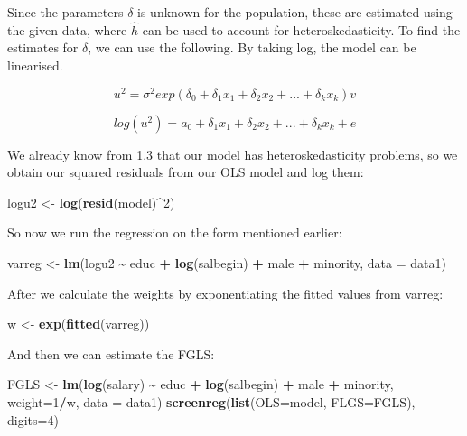 \documentclass[
]{article}
\newenvironment{Shaded}{\begin{snugshade}}{\end{snugshade}}
\newcommand{\AttributeTok}[1]{\textcolor[rgb]{0.13,0.29,0.53}{#1}}
\newcommand{\DecValTok}[1]{\textcolor[rgb]{0.00,0.00,0.81}{#1}}
\newcommand{\FunctionTok}[1]{\textcolor[rgb]{0.13,0.29,0.53}{\textbf{#1}}}
\newcommand{\NormalTok}[1]{#1}
\newcommand{\OtherTok}[1]{\textcolor[rgb]{0.56,0.35,0.01}{#1}}
\newcommand{\SpecialCharTok}[1]{\textcolor[rgb]{0.81,0.36,0.00}{\textbf{#1}}}
\begin{document}
Since the parameters \(\delta\) is unknown for the population, these are
estimated using the given data, where \(\hat{h}\) can be used to account
for heteroskedasticity. To find the estimates for \(\delta\), we can use
the following. By taking log, the model can be linearised.

\[u^2=\sigma^2exp(\delta_0+\delta_1x_1+\delta_2x_2+...+\delta_kx_k)v\]

\[log(u^2)=a_0+\delta_1x_1+\delta_2x_2+...+\delta_kx_k+e\]

We already know from 1.3 that our model has heteroskedasticity problems,
so we obtain our squared residuals from our OLS model and log them:

\begin{Shaded}
\begin{Highlighting}[]
\NormalTok{logu2 }\OtherTok{\textless{}{-}} \FunctionTok{log}\NormalTok{(}\FunctionTok{resid}\NormalTok{(model)}\SpecialCharTok{\^{}}\DecValTok{2}\NormalTok{)}
\end{Highlighting}
\end{Shaded}

So now we run the regression on the form mentioned earlier:

\begin{Shaded}
\begin{Highlighting}[]
\NormalTok{varreg }\OtherTok{\textless{}{-}} \FunctionTok{lm}\NormalTok{(logu2 }\SpecialCharTok{\textasciitilde{}}\NormalTok{ educ }\SpecialCharTok{+} \FunctionTok{log}\NormalTok{(salbegin) }\SpecialCharTok{+}\NormalTok{ male }\SpecialCharTok{+}\NormalTok{ minority, }\AttributeTok{data =}\NormalTok{ data1)}
\end{Highlighting}
\end{Shaded}

After we calculate the weights by exponentiating the fitted values from
varreg:

\begin{Shaded}
\begin{Highlighting}[]
\NormalTok{w }\OtherTok{\textless{}{-}} \FunctionTok{exp}\NormalTok{(}\FunctionTok{fitted}\NormalTok{(varreg))}
\end{Highlighting}
\end{Shaded}

And then we can estimate the FGLS:

\begin{Shaded}
\begin{Highlighting}[]
\NormalTok{FGLS }\OtherTok{\textless{}{-}} \FunctionTok{lm}\NormalTok{(}\FunctionTok{log}\NormalTok{(salary) }\SpecialCharTok{\textasciitilde{}}\NormalTok{ educ }\SpecialCharTok{+} \FunctionTok{log}\NormalTok{(salbegin) }\SpecialCharTok{+}\NormalTok{ male }\SpecialCharTok{+}\NormalTok{ minority, }\AttributeTok{weight=}\DecValTok{1}\SpecialCharTok{/}\NormalTok{w, }\AttributeTok{data =}\NormalTok{ data1)}
\FunctionTok{screenreg}\NormalTok{(}\FunctionTok{list}\NormalTok{(}\AttributeTok{OLS=}\NormalTok{model, }\AttributeTok{FLGS=}\NormalTok{FGLS), }\AttributeTok{digits=}\DecValTok{4}\NormalTok{)}
\end{Highlighting}
\end{Shaded}
\end{document}
